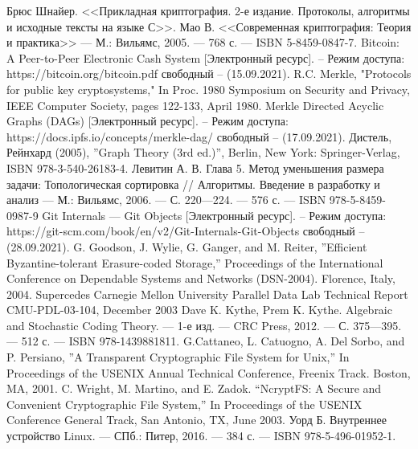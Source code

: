 \begingroup
\renewcommand{\section}[2]{}
\begin{thebibliography}{}
	Брюс Шнайер. <<Прикладная криптография. 2-е издание. Протоколы, алгоритмы и исходные тексты на языке С>>.
	Мао В. <<Современная криптография: Теория и практика>> — М.: Вильямс, 2005. — 768 с. — ISBN 5-8459-0847-7.
	Bitcoin: A Peer-to-Peer Electronic Cash System [Электронный ресурс]. – Режим доступа: 
	https://bitcoin.org/bitcoin.pdf
	свободный – (15.09.2021).
	R.C. Merkle, "Protocols for public key cryptosystems," In Proc. 1980 Symposium on Security and Privacy, IEEE Computer Society, pages 122-133, April 1980.
	Merkle Directed Acyclic Graphs (DAGs) [Электронный ресурс]. – Режим доступа: 
	https://docs.ipfs.io/concepts/merkle-dag/
	свободный – (17.09.2021).
	Дистель, Рейнхард (2005), ''Graph Theory (3rd ed.)'', Berlin, New York: Springer-Verlag, ISBN 978-3-540-26183-4.
	Левитин А. В. Глава 5. Метод уменьшения размера задачи: Топологическая сортировка // Алгоритмы. Введение в разработку и анализ — М.: Вильямс, 2006. — С. 220—224. — 576 с. — ISBN 978-5-8459-0987-9
	Git Internals --- Git Objects [Электронный ресурс]. – Режим доступа: 
	https://git-scm.com/book/en/v2/Git-Internals-Git-Objects
	свободный – (28.09.2021).
	G. Goodson, J. Wylie, G. Ganger, and M. Reiter, ''Efficient Byzantine-tolerant Erasure-coded Storage,'' Proceedings of the International Conference on Dependable Systems and Networks (DSN-2004). Florence, Italy, 2004. Supercedes Carnegie Mellon University Parallel Data Lab Technical Report CMU-PDL-03-104, December 2003
	Dave K. Kythe, Prem K. Kythe. Algebraic and Stochastic Coding Theory. — 1-е изд. — CRC Press, 2012. — С. 375—395. — 512 с. — ISBN 978-1439881811.
	G.Cattaneo, L. Catuogno, A. Del Sorbo, and P. Persiano, ''A Transparent Cryptographic File System for Unix,'' In Proceedings of the USENIX Annual Technical Conference, Freenix Track. Boston, MA, 2001.
	C. Wright, M. Martino, and E. Zadok. “NcryptFS: A Secure and Convenient Cryptographic File System,” In Proceedings of the USENIX Conference General Track, San Antonio, TX, June 2003.
	Уорд Б. Внутреннее устройство Linux. — СПб.: Питер, 2016. — 384 с. — ISBN 978-5-496-01952-1.

\end{thebibliography}
